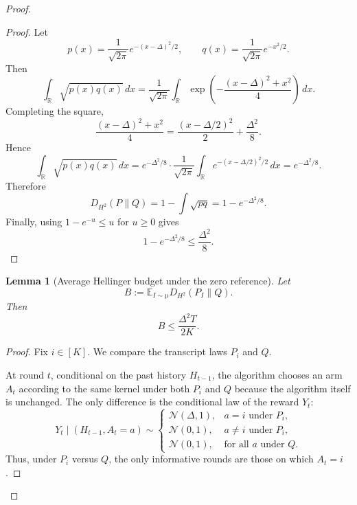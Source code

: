 \documentclass[conference]{IEEEtran}
\newtheorem{lemma}{Lemma}
\begin{document}
\begin{proof}[Proof]
\begin{proof}
Let
\[
p(x)=\frac{1}{\sqrt{2\pi}}e^{-(x-\Delta)^2/2},
\qquad
q(x)=\frac{1}{\sqrt{2\pi}}e^{-x^2/2}.
\]
Then
\[
\int_{\mathbb R}\sqrt{p(x)q(x)}\,dx
=
\frac{1}{\sqrt{2\pi}}\int_{\mathbb R}
\exp\!\left(
-\frac{(x-\Delta)^2+x^2}{4}
\right)\,dx.
\]
Completing the square,
\[
\frac{(x-\Delta)^2+x^2}{4}
=
\frac{(x-\Delta/2)^2}{2}+\frac{\Delta^2}{8}.
\]
Hence
\[
\int_{\mathbb R}\sqrt{p(x)q(x)}\,dx
=
e^{-\Delta^2/8}
\cdot
\frac{1}{\sqrt{2\pi}}
\int_{\mathbb R} e^{-(x-\Delta/2)^2/2}\,dx
=
e^{-\Delta^2/8}.
\]
Therefore
\[
D_{H^2}(P\|Q)=1-\int \sqrt{pq}
=
1-e^{-\Delta^2/8}.
\]
Finally, using $1-e^{-u}\le u$ for $u\ge 0$ gives
\[
1-e^{-\Delta^2/8}\le \frac{\Delta^2}{8}.
\]
\end{proof}

\begin{lemma}[Average Hellinger budget under the zero reference]
\label{lem:hellinger-budget-bandit}
Let
\[
B:=\mathbb{E}_{I\sim\mu}D_{H^2}(P_I\|Q).
\]
Then
\[
B\le \frac{\Delta^2T}{2K}.
\]
\end{lemma}

\begin{proof}
Fix $i\in[K]$.
We compare the transcript laws $P_i$ and $Q$.

At round $t$, conditional on the past history $H_{t-1}$, the algorithm chooses an arm $A_t$ according to the same kernel under both $P_i$ and $Q$ because the algorithm itself is unchanged.
The only difference is the conditional law of the reward $Y_t$:
\[
Y_t \mid (H_{t-1},A_t=a)
\sim
\begin{cases}
\mathcal N(\Delta,1), & a=i \text{ under }P_i,\\
\mathcal N(0,1), & a\neq i \text{ under }P_i,\\
\mathcal N(0,1), & \text{for all }a \text{ under }Q.
\end{cases}
\]
Thus, under $P_i$ versus $Q$, the only informative rounds are those on which $A_t=i$.


\end{proof}
\end{proof}
\end{document}

